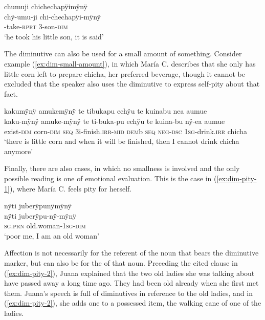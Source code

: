 \ea\label{ex:dim-small-aff}
\begingl 
\glpreamble chumuji chichechapÿimÿnÿ\\
\gla chÿ-umu-ji chi-chechapÿi-mÿnÿ\\ 
-take-\textsc{rprt} 3-son-\textsc{dim}\\ 
\glft ‘he took his little son, it is said’
\trailingcitation{[mox-n110920l.089]}
\xe

The diminutive can also be used for a small amount of something. Consider example (\ref{ex:dim-small-amount}), in which María C. describes that she only has little corn left to prepare chicha, her preferred beverage, though it cannot be excluded that the speaker also uses the diminutive to express self-pity about that fact.

\ea\label{ex:dim-small-amount}
\begingl 
\glpreamble kakumÿnÿ amukemÿnÿ te tibukapu echÿu te kuinabu nea aumue\\
\gla kaku-mÿnÿ amuke-mÿnÿ te ti-buka-pu echÿu te kuina-bu nÿ-ea aumue\\ 
\glb exist-\textsc{dim} corn-\textsc{dim} \textsc{seq} 3i-finish.\textsc{irr}-\textsc{mid} \textsc{dem}b \textsc{seq} \textsc{neg}-\textsc{dsc} 1\textsc{sg}-drink.\textsc{irr} chicha\\ 
\glft ‘there is little corn and when it will be finished, then I cannot drink chicha anymore’
\trailingcitation{[ump-p110815sf.693]}
\xe

Finally, there are also cases, in which no smallness is involved and the only possible reading is one of emotional evaluation. This is the case in (\ref{ex:dim-pity-1}), where María C. feels pity for herself.

\ea\label{ex:dim-pity-1}
\begingl 
\glpreamble nÿti juberÿpunÿmÿnÿ\\
\gla nÿti juberÿpu-nÿ-mÿnÿ\\ 
\textsc{sg.prn} old.woman-1\textsc{sg}-\textsc{dim}\\ 
\glft ‘poor me, I am an old woman’
\trailingcitation{[uxx-p110825l.038]}
\xe

Affection is not necessarily for the referent of the noun that bears the diminutive marker, but can also be for the  of that noun. Preceding the cited clause in (\ref{ex:dim-pity-2}), Juana explained that the two old ladies she was talking about have passed away a long time ago. They had been old already when she first met them. Juana’s speech is full of diminutives in reference to the old ladies, and in (\ref{ex:dim-pity-2}), she adds one to a possessed item, the walking cane of one of the ladies.

